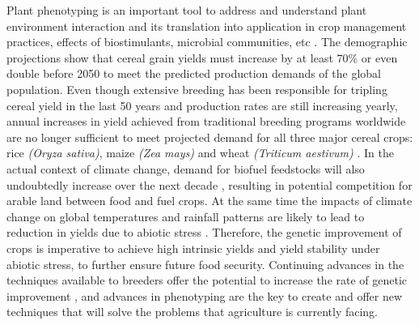 Plant phenotyping is an important tool to address and understand plant environment interaction and its translation into application in crop management practices, effects of biostimulants, microbial communities, etc \parencite{pieruschka2019plant}. 
The demographic projections show that cereal grain yields must increase by at least 70\% \parencite{furbank2009c4} or even double \parencite{tilman2011global} before 2050 to meet the predicted
production demands of the global population. Even though extensive breeding has been responsible for tripling cereal yield in the last 50 years \parencite{pingali2012green} and production rates are still increasing yearly, annual increases in yield achieved from traditional breeding programs worldwide are no longer sufficient to meet projected demand for all three major cereal crops: rice \textit{(Oryza sativa)}, maize \textit{(Zea mays)} and wheat \textit{(Triticum aestivum)} \parencite{tester2010breeding}.
 In the actual context of climate change, demand for biofuel feedstocks will also undoubtedly increase over the next decade \parencite{sticklen2007feedstock}, resulting in potential
competition for arable land between food and fuel crops. At
the same time the impacts of climate change on global
temperatures and rainfall patterns are likely to lead to
reduction in yields due to abiotic stress \parencite{tester2010breeding}. Therefore, the genetic improvement of crops is imperative to achieve high intrinsic yields and yield stability under abiotic stress, to further ensure future food security. Continuing advances in
the techniques available to breeders offer the potential to
increase the rate of genetic improvement \parencite{phillips2010mobilizing}, and advances in phenotyping are the key to create and offer new techniques that will solve the problems that agriculture is currently facing.\\

